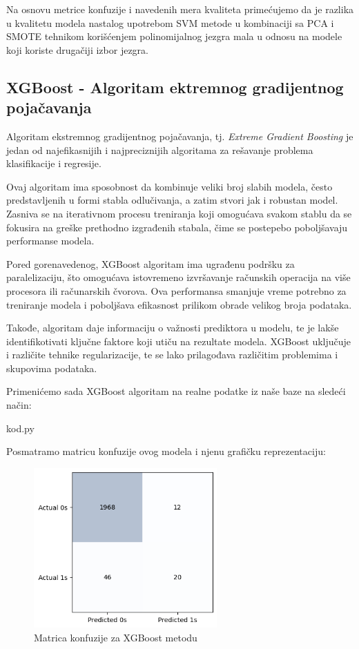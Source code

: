 \documentclass[12pt]{article}
\theoremstyle{definition}
\theoremstyle{remark}
\begin{document}
\hfill

Na osnovu metrice konfuzije i navedenih mera kvaliteta primećujemo da je razlika u kvalitetu modela nastalog upotrebom SVM metode u kombinaciji sa PCA i SMOTE tehnikom korišćenjem polinomijalnog jezgra mala u odnosu na modele koji koriste drugačiji izbor jezgra.


\subsection{XGBoost - Algoritam ektremnog gradijentnog pojačavanja}

Algoritam ekstremnog gradijentnog pojačavanja, tj. \emph{Extreme Gradient Boosting} je jedan od najefikasnijih i najpreciznijih algoritama za rešavanje problema klasifikacije i regresije.

Ovaj algoritam ima sposobnost da kombinuje veliki broj slabih modela, često predstavljenih u formi stabla odlučivanja, a zatim stvori jak i robustan model. Zasniva se na iterativnom procesu treniranja koji omogućava svakom stablu da se fokusira na greške prethodno izgrađenih stabala, čime se postepebo poboljšavaju performanse modela. 

Pored gorenavedenog, XGBoost algoritam ima ugrađenu podršku za paralelizaciju, što omogućava istovremeno izvršavanje računskih operacija na više procesora ili računarskih čvorova. Ova performansa smanjuje vreme potrebno za treniranje modela i poboljšava efikasnost prilikom obrade velikog broja podataka.

Takođe, algoritam daje informaciju o važnosti prediktora u modelu, te je lakše identifikotivati ključne faktore koji utiču na rezultate modela. XGBoost uključuje i različite tehnike regularizacije, te se lako prilagođava različitim problemima i skupovima podataka.

Primenićemo sada XGBoost algoritam na realne podatke iz naše baze na sledeći način:

\hfill

{kod.py}

\hfill

Posmatramo matricu konfuzije ovog modela i njenu grafičku reprezentaciju:

\begin{figure}[htp]
    \centering
    \includegraphics[width=7cm]{output_93_0.png}
    \caption{Matrica konfuzije za XGBoost metodu}
    \label{fig:galaxy}
\end{figure}
\end{document}
